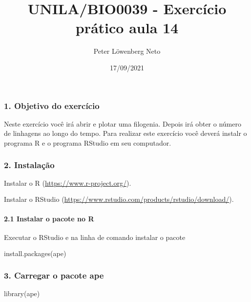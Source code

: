 \documentclass[
]{article}
\title{UNILA/BIO0039 - Exercício prático aula 14}
\author{Peter Löwenberg Neto}
\date{17/09/2021}
\newenvironment{Shaded}{\begin{snugshade}}{\end{snugshade}}
\newcommand{\FunctionTok}[1]{\textcolor[rgb]{0.00,0.00,0.00}{#1}}
\newcommand{\NormalTok}[1]{#1}
\newcommand{\StringTok}[1]{\textcolor[rgb]{0.31,0.60,0.02}{#1}}
\begin{document}
\maketitle

\hypertarget{objetivo-do-exercuxedcio}{%
\subsubsection{1. Objetivo do
exercício}\label{objetivo-do-exercuxedcio}}

Neste exercício você irá abrir e plotar uma filogenia. Depois irá obter
o número de linhagens ao longo do tempo. Para realizar este exercício
você deverá instalr o programa R e o programa RStudio em seu computador.

\hypertarget{instalauxe7uxe3o}{%
\subsubsection{2. Instalação}\label{instalauxe7uxe3o}}

Instalar o R (\url{https://www.r-project.org/}).

Instalar o RStudio
(\url{https://www.rstudio.com/products/rstudio/download/}).

\hypertarget{instalar-o-pacote-no-r}{%
\paragraph{2.1 Instalar o pacote no R}\label{instalar-o-pacote-no-r}}

Executar o RStudio e na linha de comando instalar o pacote

\begin{Shaded}
\begin{Highlighting}[]
\FunctionTok{install.packages}\NormalTok{(}\StringTok{\textquotesingle{}ape\textquotesingle{}}\NormalTok{)}
\end{Highlighting}
\end{Shaded}

\hypertarget{carregar-o-pacote-ape}{%
\subsubsection{3. Carregar o pacote ape}\label{carregar-o-pacote-ape}}

\begin{Shaded}
\begin{Highlighting}[]
\FunctionTok{library}\NormalTok{(ape)}
\end{Highlighting}
\end{Shaded}
\end{document}
